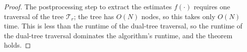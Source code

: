 \begin{proof}
The postprocessing step to extract the estimates $f(\cdot)$ requires one
traversal of the tree $\mathscr{T}_r$; the tree has $O(N)$ nodes, so this takes
only $O(N)$ time.
This is less than the runtime of the
dual-tree traversal, so the runtime of the dual-tree traversal dominates the
algorithm's runtime, and the theorem holds.
\end{proof}






